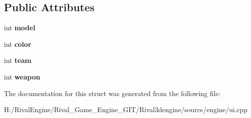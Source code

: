 \subsection*{Public Attributes}
\begin{DoxyCompactItemize}
\item 
\mbox{\label{struct_u_i_1_1_player_preview_aa477d8d28e0011ca7171751ac3abd2f9}} 
int {\bfseries model}
\item 
\mbox{\label{struct_u_i_1_1_player_preview_a7750c207f20d6799ba374319c7faf016}} 
int {\bfseries color}
\item 
\mbox{\label{struct_u_i_1_1_player_preview_addae00796a2ff3aa6e716b9595a38e32}} 
int {\bfseries team}
\item 
\mbox{\label{struct_u_i_1_1_player_preview_a6de8dfd3d43574382941aeebaa233387}} 
int {\bfseries weapon}
\end{DoxyCompactItemize}


The documentation for this struct was generated from the following file\+:\begin{DoxyCompactItemize}
\item 
H\+:/\+Rival\+Engine/\+Rival\+\_\+\+Game\+\_\+\+Engine\+\_\+\+G\+I\+T/\+Rival3dengine/source/engine/ui.\+cpp\end{DoxyCompactItemize}
